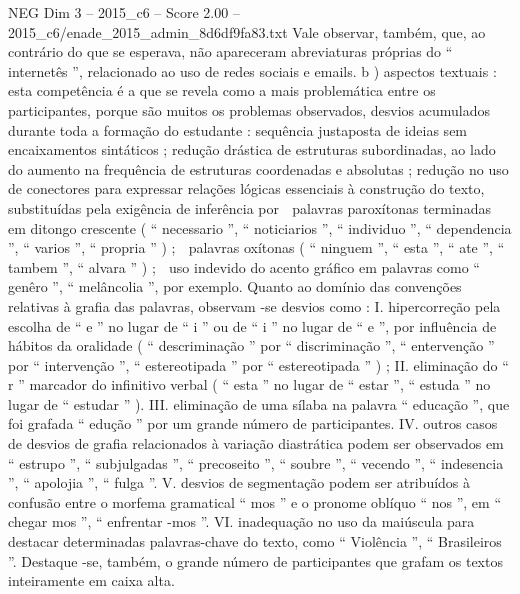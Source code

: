 \begin{textsample}{NEG Dim 3 – 2015\_c6 – Score 2.00 – 2015\_c6/enade\_2015\_admin\_8d6df9fa83.txt}
Vale observar, também, que, ao contrário do que se esperava, não apareceram abreviaturas próprias do “ internetês ”, relacionado ao uso de redes sociais e emails. b ) aspectos textuais : esta competência é a que se revela como a mais problemática entre os participantes, porque são muitos os problemas observados, desvios acumulados durante toda a formação do estudante : sequência justaposta de ideias sem encaixamentos sintáticos ; redução drástica de estruturas subordinadas, ao lado do aumento na frequência de estruturas coordenadas e absolutas ; redução no uso de conectores para expressar relações lógicas essenciais à construção do texto, substituídas pela exigência de inferência por  palavras paroxítonas terminadas em ditongo crescente ( “ necessario ”, “ noticiarios ”, “ individuo ”, “ dependencia ”, “ varios ”, “ propria ” ) ;  palavras oxítonas ( “ ninguem ”, “ esta ”, “ ate ”, “ tambem ”, “ alvara ” ) ;  uso indevido do acento gráfico em palavras como “ genêro ”, “ melâncolia ”, por exemplo.
Quanto ao domínio das convenções relativas à grafia das palavras, observam -se desvios como : I. hipercorreção pela escolha de “ e ” no lugar de “ i ” ou de “ i ” no lugar de “ e ”, por influência de hábitos da oralidade ( “ descriminação ” por “ discriminação ”, “ entervenção ” por “ intervenção ”, “ estereotipada ” por “ estereotipada ” ) ; II. eliminação do “ r ” marcador do infinitivo verbal ( “ esta ” no lugar de “ estar ”, “ estuda ” no lugar de “ estudar ” ).
III. eliminação de uma sílaba na palavra “ educação ”, que foi grafada “ edução ” por um grande número de participantes.
IV. outros casos de desvios de grafia relacionados à variação diastrática podem ser observados em “ estrupo ”, “ subjulgadas ”, “ precoseito ”, “ soubre ”, “ vecendo ”, “ indesencia ”, “ apolojia ”, “ fulga ”.
V. desvios de segmentação podem ser atribuídos à confusão entre o morfema gramatical “ mos ” e o pronome oblíquo “ nos ”, em “ chegar mos ”, “ enfrentar -mos ”.
VI. inadequação no uso da maiúscula para destacar determinadas palavras-chave do texto, como “ Violência ”, “ Brasileiros ”.
Destaque -se, também, o grande número de participantes que grafam os textos inteiramente em caixa alta.

\end{textsample}
